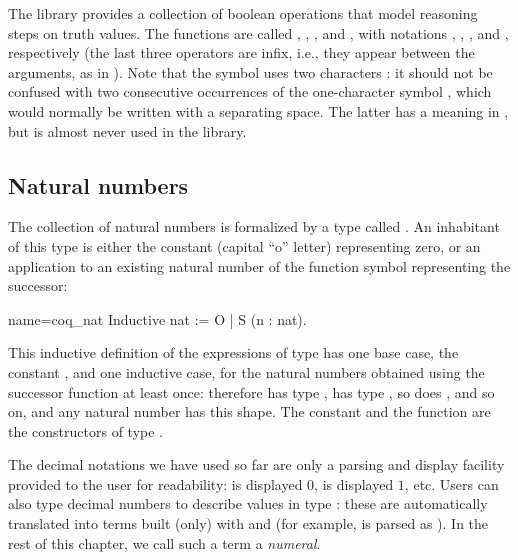 The \mcbMC{} library provides a collection of boolean operations that
model reasoning steps on truth values.  The functions are called
, , , and , with notations
\C{\~\~},  \C{||}, \C{&&}, and \C{==>}, respectively
(the last three operators are
infix, i.e., they appear between the arguments, as in ).
Note that the symbol \C{\~\~} uses two characters \C{\~}: it should
not be confused with two consecutive occurrences of the one-character symbol
\C{\~}, which would normally be written with a separating space.
The latter has a meaning in \Coq{}, but is almost never used
in the \mcbMC{} library.


\subsection{Natural numbers}
\label{ssec:nat}

The collection of natural numbers is formalized by a type called
.  An inhabitant of this type is either the constant 
(capital ``o'' letter) representing zero, or an
application to an existing natural number of the function symbol 
representing the successor:

\begin{coq}{name=coq_nat}{}
Inductive nat := O | S (n : nat).
\end{coq}

This inductive definition of the expressions of type  has one
base case, the constant , and one inductive case, for the natural
numbers obtained using the successor function at least once: therefore
 has type ,  has type , so does
, and
so on, and any natural number has this shape. The constant  and
the function  are the constructors of type .

The decimal
notations we have used so far are only a parsing and display
facility provided to the user for readability:  is displayed
$0$,  is displayed $1$, etc.  Users can also type decimal
numbers to describe values in type : these are automatically
translated into terms built (only) with  and  (for example,
 is parsed as ). In the rest
of this chapter, we call such a term a \emph{numeral}.

